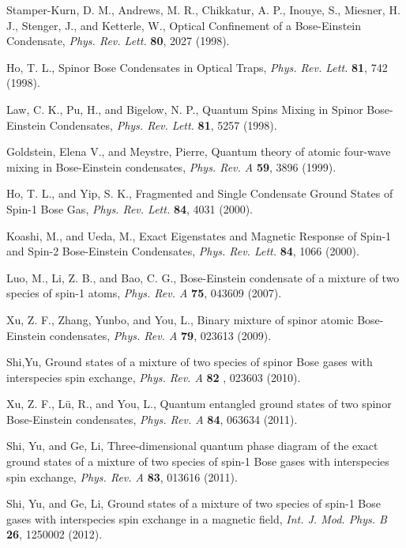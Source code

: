 \documentclass[10pt]{wlscirep}
\begin{document}
\begin{thebibliography}{99}
 Stamper-Kurn, D. M., Andrews, M. R., Chikkatur, A. P.,
Inouye, S., Miesner, H. J., Stenger, J., and Ketterle, W., Optical
Confinement of a Bose-Einstein Condensate, \textit{Phys. Rev. Lett.} \textbf{%
80}, 2027 (1998).

 Ho, T. L., Spinor Bose Condensates in Optical Traps, \textit{%
Phys. Rev. Lett.} \textbf{81}, 742 (1998).

 Law, C. K., Pu, H., and Bigelow, N. P., Quantum Spins Mixing
in Spinor Bose-Einstein Condensates, \textit{Phys. Rev. Lett.} \textbf{81},
5257 (1998).

 Goldstein, Elena V., and Meystre, Pierre, Quantum theory of
atomic four-wave mixing in Bose-Einstein condensates, \textit{Phys. Rev. A}
\textbf{59}, 3896 (1999).

 Ho, T. L., and Yip, S. K., Fragmented and Single Condensate
Ground States of Spin-1 Bose Gas, \textit{Phys. Rev. Lett.} \textbf{84},
4031 (2000).

 Koashi, M., and Ueda, M., Exact Eigenstates and Magnetic
Response of Spin-1 and Spin-2 Bose-Einstein Condensates, \textit{Phys. Rev.
Lett.} \textbf{84}, 1066 (2000).

 Luo, M., Li, Z. B., and Bao, C. G., Bose-Einstein condensate of
a mixture of two species of spin-1 atoms, \textit{Phys. Rev. A} \textbf{75},
043609 (2007).

 Xu, Z. F., Zhang, Yunbo, and You, L., Binary mixture of
spinor atomic Bose-Einstein condensates, \textit{Phys. Rev. A} \textbf{79},
023613 (2009).

 Shi,Yu, Ground states of a mixture of two species of spinor
Bose gases with interspecies spin exchange, \textit{Phys. Rev. A} \textbf{82}%
, 023603 (2010).

 Xu, Z. F., L\"{u}, R., and You, L., Quantum entangled ground
states of two spinor Bose-Einstein condensates, \textit{Phys. Rev. A}
\textbf{84}, 063634 (2011).

 Shi, Yu, and Ge, Li, Three-dimensional quantum phase diagram
of the exact ground states of a mixture of two species of spin-1 Bose gases
with interspecies spin exchange, \textit{Phys. Rev. A} \textbf{83}, 013616
(2011).

 Shi, Yu, and Ge, Li, Ground states of a mixture of two
species of spin-1 Bose gases with interspecies spin exchange in a magnetic
field, \textit{Int. J. Mod. Phys. B} \textbf{26}, 1250002 (2012).


\end{thebibliography}
\end{document}
